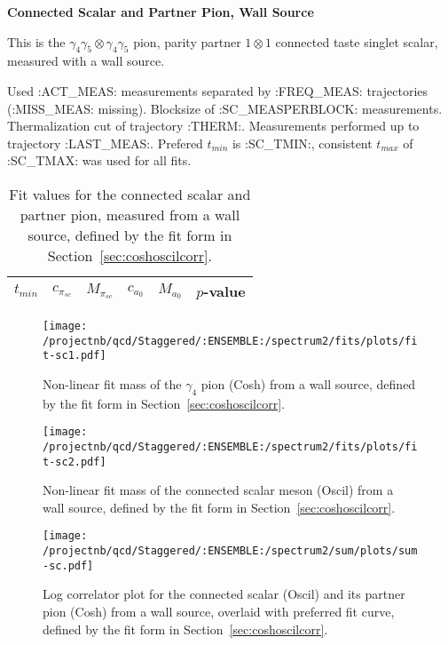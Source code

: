 \clearpage

\centerline{\textbf{Connected Scalar and Partner Pion, Wall Source}}

This is the $\gamma_4 \gamma_5 \otimes \gamma_4 \gamma_5$ pion, parity partner $1 \otimes 1$ connected taste singlet scalar, measured with a wall source. 

{\small{Used :ACT_MEAS: measurements separated by :FREQ_MEAS: trajectories (:MISS_MEAS: missing). Blocksize of :SC_MEASPERBLOCK: measurements. Thermalization cut of trajectory :THERM:. Measurements performed up to trajectory :LAST_MEAS:. Prefered $t_{min}$ is :SC_TMIN:, consistent $t_{max}$ of :SC_TMAX: was used for all fits.}}

\begin{table}[ht!]
\centering
\scriptsize
\begin{tabular}{|c|c|c|c|c|c|}
\hline
 $t_{min}$ & $c_{\pi_{sc}}$ &  $M_{\pi_{sc}}$ & $c_{a_0}$ & $M_{a_0}$ & $p$-value \\
\hline

\end{tabular}
\caption{Fit values for the connected scalar and partner pion, measured from a wall source, defined by the fit form in Section~\ref{sec:coshoscilcorr}.}
\end{table}


\begin{multicols}{2}
\begin{figure}[H]
\centering
\texttt{[image: /projectnb/qcd/Staggered/:ENSEMBLE:/spectrum2/fits/plots/fit-sc1.pdf]}
\caption{Non-linear fit mass of the $\gamma_4$ pion (Cosh) from a wall source, defined by the fit form in Section~\ref{sec:coshoscilcorr}.}
\end{figure}
\columnbreak
\begin{figure}[H]
\centering
\texttt{[image: /projectnb/qcd/Staggered/:ENSEMBLE:/spectrum2/fits/plots/fit-sc2.pdf]}
\caption{Non-linear fit mass of the connected scalar meson (Oscil) from a wall source, defined by the fit form in Section~\ref{sec:coshoscilcorr}.}
\end{figure}
\end{multicols}

\begin{figure}[H]
\centering
\texttt{[image: /projectnb/qcd/Staggered/:ENSEMBLE:/spectrum2/sum/plots/sum-sc.pdf]}
\caption{Log correlator plot for the connected scalar (Oscil) and its partner pion (Cosh) from a wall source, overlaid with preferred fit curve, defined by the fit form in Section~\ref{sec:coshoscilcorr}.}
\end{figure}

